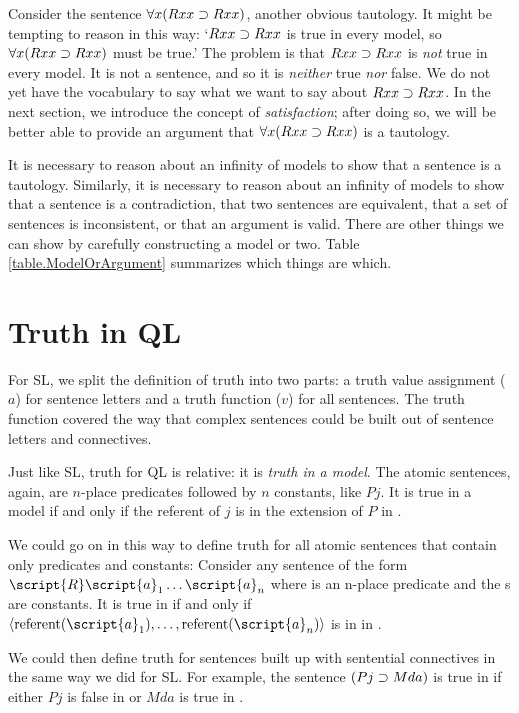 Consider the sentence $\forall x(Rxx\supset Rxx)$, another obvious tautology. It might be tempting to reason in this way: `$Rxx\supset Rxx$ is true in every model, so $\forall x(Rxx\supset Rxx)$ must be true.' The problem is that $Rxx\supset Rxx$ is \emph{not} true in every model. It is not a sentence, and so it is \emph{neither} true \emph{nor} false. We do not yet have the vocabulary to say what we want to say about $Rxx\supset Rxx$. In the next section, we introduce the concept of \emph{satisfaction}; after doing so, we will be better able to provide an argument that $\forall x(Rxx\supset Rxx)$ is a tautology.

It is necessary to reason about an infinity of models to show that a sentence is a tautology. Similarly, it is necessary to reason about an infinity of models to show that a sentence is a contradiction, that two sentences are equivalent, that a set of sentences is inconsistent, or that an argument is valid. There are other things we can show by carefully constructing a model or two. Table \ref{table.ModelOrArgument} summarizes which things are which.






\section{Truth in QL}
\label{sec.TruthInQL}
For SL, we split the definition of truth into two parts: a truth value assignment ($a$) for sentence letters and a truth function ($v$) for all sentences. The truth function covered the way that complex sentences could be built out of sentence letters and connectives.

Just like SL, truth for QL is relative: it is \emph{truth in a model}. The atomic sentences, again, are $n$-place predicates followed by $n$ constants, like $Pj$. It is true in a model  if and only if the referent of $j$ is in the extension of $P$ in .

We could go on in this way to define truth for all atomic sentences that contain only predicates and constants: Consider any sentence of the form $\script{R}\script{a}_1\ldots\script{a}_n$ where  is an n-place predicate and the s are constants. It is true in  if and only if ${\langle}\referent{\script{a}_1},\ldots,\referent{\script{a}_n}{\rangle}$ is in  in .

We could then define truth for sentences built up with sentential connectives in the same way we did for SL. For example, the sentence $(Pj \supset Mda)$ is true in  if either $Pj$ is false in  or $Mda$ is true in .

